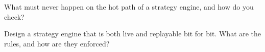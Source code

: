 \begin{interviewq}\label{iq:ll:the-strategy-engine:5}
What must never happen on the hot path of a strategy engine, and how do you check?
\end{interviewq}

\begin{interviewq}\label{iq:ll:the-strategy-engine:6}
Design a strategy engine that is both live and replayable bit for bit. What are the rules, and how are they enforced?
\end{interviewq}
